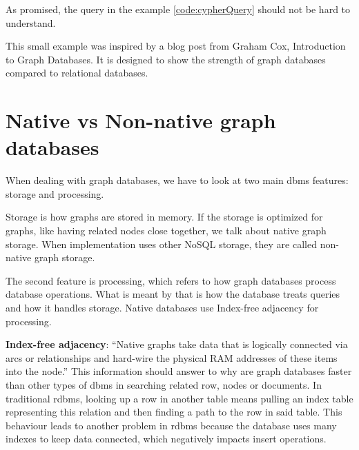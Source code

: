 
As promised, the query in the example \ref{code:cypherQuery} should not be hard to understand.

This small example was inspired by a blog post from Graham Cox, Introduction to Graph Databases. \cite{cox_introduction_2017}
It is designed to show the strength of graph databases compared to relational databases.

\section {Native vs Non-native graph databases}

When dealing with graph databases, we have to look at two main \acrshort{dbms} features: storage and processing.

Storage is how graphs are stored in memory. If the storage is optimized for graphs, like having related nodes close together, we talk about native graph storage.
When implementation uses other NoSQL storage, they are called non-native graph storage.

The second feature is processing, which refers to how graph databases process database operations.
What is meant by that is how the database treats queries and how it handles storage.
Native databases use Index-free adjacency for processing.
\cite{chao_graph_2018}

\textbf{Index-free adjacency}: ``Native graphs take data that is logically connected via arcs or relationships and hard-wire the physical RAM addresses of these items into the node.'' \cite{mccreary_neighborhood_2021}
This information should answer to why are graph databases faster than other types of \acrshort{dbms} in searching related row, nodes or documents.
In traditional \acrshort{rdbms}, looking up a row in another table means pulling an index table representing this relation and then finding a path to the row in said table.
This behaviour leads to another problem in \acrshort{rdbms} because the database uses many indexes to keep data connected, which negatively impacts insert operations.

